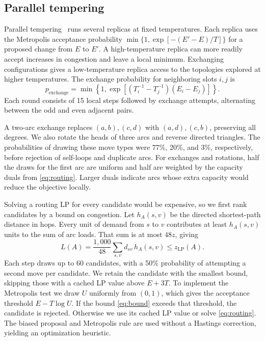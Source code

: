 \documentclass[a4paper]{article}
\begin{document}
\subsection{Parallel tempering}

Parallel tempering~\cite{hukushima1996} runs several replicas at fixed temperatures.
Each replica uses the Metropolis acceptance probability \(\min\{1,\exp[-(E'-E)/T]\}\) for a proposed change from \(E\) to \(E'\).
A high-temperature replica can more readily accept increases in congestion and leave a local minimum.
Exchanging configurations gives a low-temperature replica access to the topologies explored at higher temperatures.
The exchange probability for neighboring slots \(i,j\) is
\[
 p_{\mathrm{exchange}}=\min\!\left\{1,\exp\!\left[
 (T_i^{-1}-T_j^{-1})(E_i-E_j)\right]\right\}.
\]
Each round consists of 15 local steps followed by exchange attempts, alternating between the odd and even adjacent pairs.

A two-arc exchange replaces \((a,b),(c,d)\) with \((a,d),(c,b)\), preserving all degrees. We also rotate the heads
of three arcs and reverse directed triangles. The probabilities of drawing these move types were
77\%, 20\%, and 3\%, respectively, before rejection of self-loops and duplicate arcs. For exchanges and rotations,
half the draws for the first arc are uniform and half are weighted by the capacity duals from \eqref{eq:routing}.
Larger duals indicate arcs whose extra capacity would reduce the objective locally.

Solving a routing LP for every candidate would be expensive, so we first rank candidates by a bound on congestion.
Let \(h_A(s,v)\) be the directed shortest-path distance in hops. Every unit of demand from \(s\) to \(v\) contributes
at least \(h_A(s,v)\) units to the sum of arc loads. That sum is at most \(48z\), giving
\begin{equation}
\label{eq:bound}
 L(A)=\frac{1{,}000}{48}\sum_{s,v}d_{sv}\,h_A(s,v)\le z_{\mathrm{LP}}(A).
\end{equation}
Each step draws up to 60 candidates, with a 50\% probability of attempting a second move per candidate.
We retain the candidate with the smallest bound, skipping those with a cached LP value above \(E+3T\).
To implement the Metropolis test we draw \(U\) uniformly from \((0,1)\), which gives the acceptance threshold \(E-T\log U\).
If the bound \eqref{eq:bound} exceeds that threshold, the candidate is rejected.
Otherwise we use its cached LP value or solve \eqref{eq:routing}.
The biased proposal and Metropolis rule are used without a Hastings correction, yielding an optimization heuristic.
\end{document}
